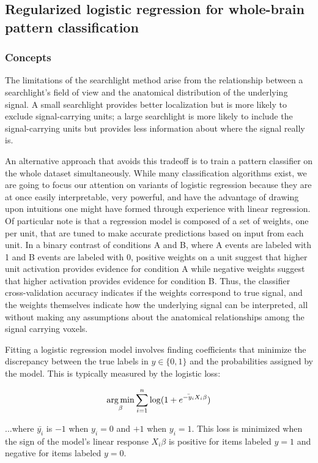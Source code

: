 \subsection{Regularized logistic regression for whole-brain pattern classification}
\subsubsection{Concepts}
The limitations of the searchlight method arise from the relationship between a searchlight's field of view and the anatomical distribution of the underlying signal. A small searchlight provides better localization but is more likely to exclude signal-carrying units; a large searchlight is more likely to include the signal-carrying units but provides less information about where the signal really is. 

An alternative approach that avoids this tradeoff is to train a pattern classifier on the whole dataset simultaneously. While many classification algorithms exist, we are going to focus our attention on variants of logistic regression because they are at once easily interpretable, very powerful, and have the advantage of drawing upon intuitions one might have formed through experience with linear regression. Of particular note is that a regression model is composed of a set of weights, one per unit, that are tuned to make accurate predictions based on input from each unit. In a binary contrast of conditions A and B, where A events are labeled with 1 and B events are labeled with 0, positive weights on a unit suggest that higher unit activation provides evidence for condition A while negative weights suggest that higher activation provides evidence for condition B. Thus, the classifier cross-validation accuracy indicates if the weights correspond to true signal, and the weights themselves indicate how the underlying signal can be interpreted, all without making any assumptions about the anatomical relationships among the signal carrying voxels.

Fitting a logistic regression model involves finding coefficients that minimize the discrepancy between the true labels in $y \in{\{0,1\}}$ and the probabilities assigned by the model. This is typically measured by the logistic loss:

\begin{align}
\operatorname*{arg\,min}_\beta \sum^{n}_{i=1}{\log(1 + e^{\bar{-y_i} X_i\beta})}
\label{eq.logisticopt}
\end{align}

...where $\bar{y_i}$ is $-1$ when $y_i=0$ and $+1$ when $y_i=1$. This loss is minimized when the sign of the model's linear response $X_i\beta$ is positive for items labeled $y=1$ and negative for items labeled $y=0$.

